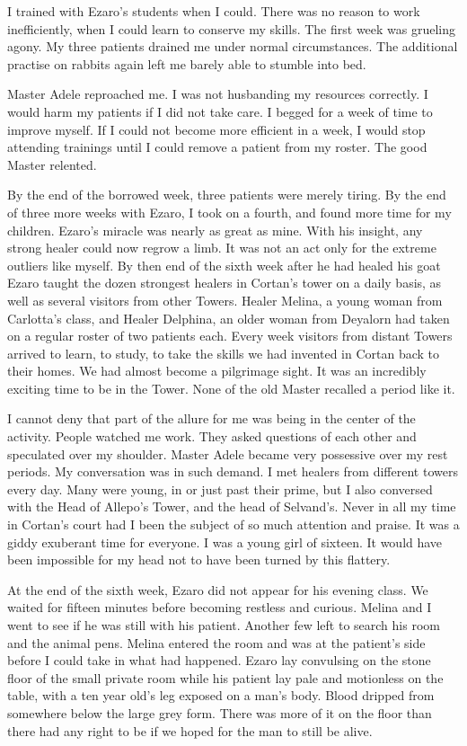 \documentclass{article}
\begin{document}
I trained with Ezaro's students when I could. There was no reason to work inefficiently, when I could learn to conserve my skills. The first week was grueling agony. My three patients drained me under normal circumstances. The additional practise on rabbits again left me barely able to stumble into bed.

Master Adele reproached me. I was not husbanding my resources correctly. I would harm my patients if I did not take care. I begged for a week of time to improve myself. If I could not become more efficient in a week, I would stop attending trainings until I could remove a patient from my roster. The good Master relented.

By the end of the borrowed week, three patients were merely tiring. By the end of three more weeks with Ezaro, I took on a fourth, and found more time for my children. Ezaro's miracle was nearly as great as mine. With his insight, any strong healer could now regrow a limb. It was not an act only for the extreme outliers like myself. By then end of the sixth week after he had healed his goat Ezaro taught the dozen strongest healers in Cortan's tower on a daily basis, as well as several visitors from other Towers. Healer Melina, a young woman from Carlotta's class, and Healer Delphina, an older woman from Deyalorn had taken on a regular roster of two patients each. Every week visitors from distant Towers arrived to learn, to study, to take the skills we had invented in Cortan back to their homes. We had almost become a pilgrimage sight. It was an incredibly exciting time to be in the Tower. None of the old Master recalled a period like it. 

I cannot deny that part of the allure for me was being in the center of the activity. People watched me work. They asked questions of each other and speculated over my shoulder. Master Adele became very possessive over my rest periods. My conversation was in such demand. I met healers from different towers every day. Many were young, in or just past their prime, but I also conversed with the Head of Allepo's Tower, and the head of Selvand's. Never in all my time in Cortan's court had I been the subject of so much attention and praise. It was a giddy exuberant time for everyone. I was a young girl of sixteen. It would have been impossible for my head not to have been turned by this flattery.

At the end of the sixth week, Ezaro did not appear for his evening class. We waited for fifteen minutes before becoming restless and curious. Melina and I went to see if he was still with his patient. Another few left to search his room and the animal pens. Melina entered the room and was at the patient's side before I could take in what had happened. Ezaro lay convulsing on the stone floor of the small private room while his patient lay pale and motionless on the table, with a ten year old's leg exposed on a man's body. Blood dripped from somewhere below the large grey form. There was more of it on the floor than there had any right to be if we hoped for the man to still be alive.
\end{document}

